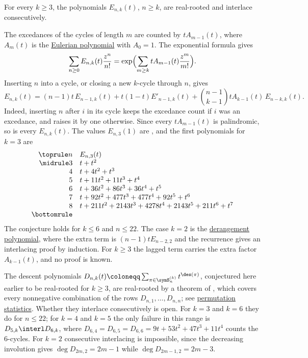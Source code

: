\begin{conjecture}[Alexandersson, 2026]
\label{conjLongCycleExcedances}
For every $k\geq 3$, the polynomials $E_{n,k}(t)$, $n\geq k$, are
real-rooted and interlace consecutively.
\end{conjecture}

The excedances of the cycles of length $m$ are counted by $tA_{m-1}(t)$,
where $A_m(t)$ is the \hyperref[eulerianPolynomial]{Eulerian polynomial}
with $A_0=1$.  The exponential formula gives
\[
  \sum_{n\geq 0}E_{n,k}(t)\frac{z^n}{n!}
  =\exp\Bigl(\sum_{m\geq k}tA_{m-1}(t)\frac{z^m}{m!}\Bigr).
\]
Inserting $n$ into a cycle, or closing a new $k$-cycle through $n$, gives
\[
  E_{n,k}(t)=(n-1)t\,E_{n-1,k}(t)+t(1-t)E'_{n-1,k}(t)
  +\binom{n-1}{k-1}tA_{k-1}(t)\,E_{n-k,k}(t).
\]
Indeed, inserting $n$ after $i$ in its cycle keeps the excedance count if
$i$ was an excedance, and raises it by one otherwise.  Since every
$tA_{m-1}(t)$ is palindromic, so is every $E_{n,k}(t)$.  The values
$E_{n,3}(1)$ are , and the first polynomials for $k=3$ are
\[
\begin{array}{rl}
\toprule
n & E_{n,3}(t) \\
\midrule
3 & t+t^2 \\
4 & t+4t^2+t^3 \\
5 & t+11t^2+11t^3+t^4 \\
6 & t+36t^2+86t^3+36t^4+t^5 \\
7 & t+92t^2+477t^3+477t^4+92t^5+t^6 \\
8 & t+211t^2+2143t^3+4278t^4+2143t^5+211t^6+t^7 \\
\bottomrule
\end{array}
\]
The conjecture holds for $k\leq 6$ and $n\leq 22$.  The case $k=2$ is the
\hyperref[derangementPolynomial]{derangement polynomial}, where the extra
term is $(n-1)tE_{n-2,2}$ and the recurrence gives an interlacing proof by
induction.  For $k\geq3$ the lagged term carries the extra factor
$A_{k-1}(t)$, and no proof is known.

The descent polynomials $D_{n,k}(t)\coloneqq\sum_{\pi\in\symS_n^{(k)}}t^{\des(\pi)}$,
conjectured here earlier to be real-rooted for $k\geq3$, are real-rooted by a
theorem of , which covers every nonnegative combination of
the rows $D_{n,1},\dotsc,D_{n,n}$; see
\hyperref[longCycleDescentsRealRooted]{permutation statistics}.  Whether
they interlace consecutively is open.  For $k=3$ and $k=6$ they do for
$n\leq22$; for $k=4$ and $k=5$ the only failure in this range is
$D_{5,k}\interl D_{6,k}$, where $D_{6,4}=D_{6,5}=D_{6,6}=9t+53t^2+47t^3+11t^4$
counts the $6$-cycles.  For $k=2$ consecutive interlacing is impossible,
since the decreasing involution gives $\deg D_{2m,2}=2m-1$ while
$\deg D_{2m-1,2}=2m-3$.


